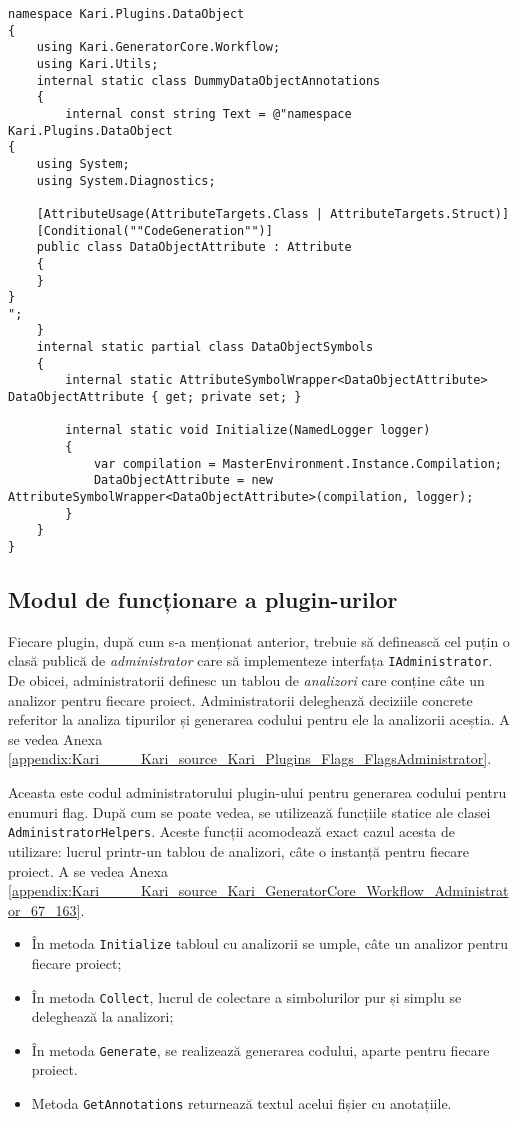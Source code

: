 \documentclass[a4paper,12pt]{report}
\begin{document}
\begin{verbatim}
namespace Kari.Plugins.DataObject
{
    using Kari.GeneratorCore.Workflow;
    using Kari.Utils;
    internal static class DummyDataObjectAnnotations
    {
        internal const string Text = @"namespace Kari.Plugins.DataObject
{
    using System;
    using System.Diagnostics;

    [AttributeUsage(AttributeTargets.Class | AttributeTargets.Struct)]
    [Conditional(""CodeGeneration"")]
    public class DataObjectAttribute : Attribute
    {
    }
}
";
    }
    internal static partial class DataObjectSymbols
    {
        internal static AttributeSymbolWrapper<DataObjectAttribute> DataObjectAttribute { get; private set; }

        internal static void Initialize(NamedLogger logger)
        {
            var compilation = MasterEnvironment.Instance.Compilation;
            DataObjectAttribute = new AttributeSymbolWrapper<DataObjectAttribute>(compilation, logger);
        }
    }
}
\end{verbatim}

\subsection{Modul de funcționare a plugin-urilor}

Fiecare plugin, după cum s-a menționat anterior, trebuie să definească cel puțin o clasă publică de \emph{administrator} care să implementeze interfața \texttt{IAdministrator}.
De obicei, administratorii definesc un tablou de \emph{analizori} care conține câte un analizor pentru fiecare proiect.
Administratorii deleghează deciziile concrete referitor la analiza tipurilor și generarea codului pentru ele la analizorii aceștia.
A se vedea Anexa \ref{appendix:Kari____Kari_source_Kari_Plugins_Flags_FlagsAdministrator}.

Aceasta este codul administratorului plugin-ului pentru generarea codului pentru enumuri flag.
După cum se poate vedea, se utilizează funcțiile statice ale clasei \texttt{AdministratorHelpers}.
Aceste funcții acomodează exact cazul acesta de utilizare: lucrul printr-un tablou de analizori, câte o instanță pentru fiecare proiect.
A se vedea Anexa \ref{appendix:Kari____Kari_source_Kari_GeneratorCore_Workflow_Administrator_67_163}.

\begin{itemize}
  \item În metoda \texttt{Initialize\(\)} tabloul cu analizorii se umple, câte un analizor pentru fiecare proiect;
  \item În metoda \texttt{Collect\(\)}, lucrul de colectare a simbolurilor pur și simplu se deleghează la analizori;
  \item În metoda \texttt{Generate\(\)}, se realizează generarea codului, aparte pentru fiecare proiect.
  \item Metoda \texttt{GetAnnotations\(\)} returnează textul acelui fișier cu anotațiile.
\end{itemize}
\end{document}
